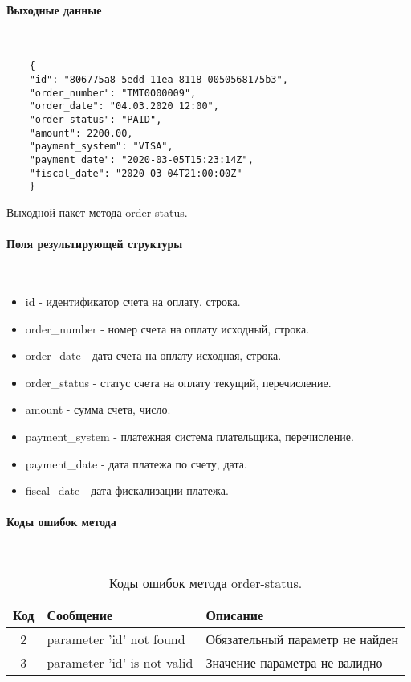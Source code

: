 \documentclass[11pt, a4paper]{article}
\begin{document}
\paragraph{Выходные данные}\

\begin{listing}[H]
	\begin{verbatim}
	{
	"id": "806775a8-5edd-11ea-8118-0050568175b3",
	"order_number": "ТМТ0000009",
	"order_date": "04.03.2020 12:00",
	"order_status": "PAID",
	"amount": 2200.00,
	"payment_system": "VISA",
	"payment_date": "2020-03-05T15:23:14Z",
	"fiscal_date": "2020-03-04T21:00:00Z"
	}
	\end{verbatim}
	\caption{Выходной пакет метода order-status.} 
\end{listing}

\paragraph{Поля результирующей структуры}\

\begin{itemize}
	\item id - идентификатор счета на оплату, строка.
	\item order\_number - номер счета на оплату исходный, строка.
	\item order\_date - дата счета на оплату исходная, строка.
	\item order\_status - статус счета на оплату текущий, перечисление.
	\item amount - сумма счета, число.
	\item payment\_system - платежная система плательщика, перечисление.
	\item payment\_date - дата платежа по счету, дата.
	\item fiscal\_date - дата фискализации платежа.
\end{itemize}

\paragraph{Коды ошибок метода}\

\begin{table}[H]
	\centering
	
	\begin{tabular}{| c | p{7cm} | p{8cm} |}
		\hline
		Код & Сообщение & Описание \\
		\hline
		2 & parameter 'id' not found & Обязательный параметр не найден \\
		3 & parameter 'id' is not valid & Значение параметра не валидно \\
		\hline
	\end{tabular}
	\caption{Коды ошибок метода order-status.}
\end{table}
\end{document}
